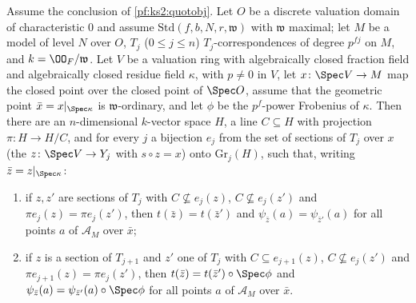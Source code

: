 \begin{proposition}\label{pf:ks2:ew}
Assume the conclusion of \cref{pf:ks2:quotobj}. Let $O$ be a discrete valuation domain of
characteristic $0$ and assume $\mathrm{Std}(f,b,N,r,\mathfrak w)$ with $\mathfrak w$ maximal; let $M$
be a model of level $N$ over $O$, $T_j$ ($0\le j\le n$) $T_j$-correspondences of degree $p^{fj}$ on
$M$, and $k=\kstwoOF/\mathfrak w$. Let $V$ be a valuation ring with algebraically closed fraction
field and algebraically closed residue field $\kappa$, with $p\ne0$ in $V$, let $x\colon\Spec V\to
M$ map the closed point over the closed point of $\Spec O$, assume that the geometric point $\bar
x=x|_{\Spec\kappa}$ is $\mathfrak w$-ordinary, and let $\phi$ be the $p^f$-power Frobenius of
$\kappa$. Then there are an $n$-dimensional $k$-vector space $H$, a line $C\subseteq H$ with
projection $\pi\colon H\to H/C$, and for every $j$ a bijection $e_j$ from the set of sections of
$T_j$ over $x$ (the $z\colon\Spec V\to Y_j$ with $s\circ z=x$) onto $\mathrm{Gr}_j(H)$, such that,
writing $\bar z=z|_{\Spec\kappa}$:
\begin{enumerate}[label=(\alph*)]
\item if $z,z'$ are sections of $T_j$ with $C\not\subseteq e_j(z)$, $C\not\subseteq e_j(z')$ and
  $\pi e_j(z)=\pi e_j(z')$, then $t(\bar z)=t(\bar z')$ and $\psi_{\bar z}(a)=\psi_{\bar z'}(a)$ for
  all points $a$ of $\mathcal A_M$ over $\bar x$;
\item if $z$ is a section of $T_{j+1}$ and $z'$ one of $T_j$ with $C\subseteq e_{j+1}(z)$,
  $C\not\subseteq e_j(z')$ and $\pi e_{j+1}(z)=\pi e_j(z')$, then $t(\bar z)=t(\bar
  z')\circ\Spec\phi$ and $\psi_{\bar z}(a)=\psi_{\bar z'}(a)\circ\Spec\phi$ for all points $a$ of
  $\mathcal A_M$ over $\bar x$.
\end{enumerate}
\end{proposition}


